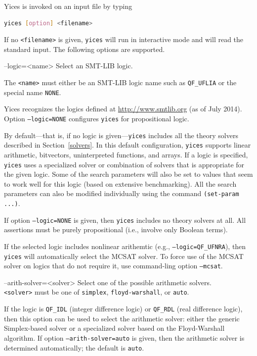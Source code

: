 \documentclass[11pt,twoside,fleqn,openright,titlepage]{cslreport}
\newenvironment{options}{
\begin{list}{}{
\setlength{\labelsep}{1.8ex}
\setlength{\labelwidth}{0pt}
\setlength{\itemindent}{-0.5\leftmargin}
\settowidth{\leftmargin}{\texttt{--}}
\renewcommand{\makelabel}{\optionlabel}}}
{\end{list}}
\newcommand*\optionlabel[1]{\hspace\labelsep\texttt{#1}}
\begin{document}
Yices is invoked on an input file by typing
\begin{lstlisting}[language=sh]
   yices [option] <filename>
\end{lstlisting}
If no \texttt{<filename>} is given, \texttt{yices} will run in
interactive mode and will read the standard input. The following
options are supported.
\begin{options}
\item[--logic=<name>] Select an SMT-LIB logic.

  The \texttt{<name>} must either be an SMT-LIB logic name such as
  \texttt{QF\_UFLIA} or the special name \texttt{NONE}.

  Yices recognizes the logics defined at \url{http://www.smtlib.org}
  (as of July 2014).  Option \texttt{--logic=NONE} configures
  \texttt{yices} for propositional logic.

  By default---that is, if no logic is given---\texttt{yices} includes
  all the  theory solvers described in  Section~\ref{solvers}. In this
  default  configuration, \texttt{yices}  supports  linear arithmetic,
  bitvectors,  uninterpreted  functions, and  arrays.  If  a logic  is
  specified, \texttt{yices}  uses a specialized  solver or combination
  of  solvers that is  appropriate for  the given  logic. Some  of the
  search parameters will also be set  to values that seem to work well
  for  this logic (based  on extensive  benchmarking). All  the search
  parameters  can  also be  modified  individually  using the  command
  \texttt{(set-param ...)}.

  If  option  \texttt{--logic=NONE}   is  given,  then  \texttt{yices}
  includes no  theory solvers  at all. All  assertions must  be purely
  propositional (i.e., involve only Boolean terms).

  If the selected logic includes nonlinear arithemtic (e.g.,
  \texttt{--logic=QF\_UFNRA}), then \texttt{yices} will automatically
  select the MCSAT solver. To force use of the MCSAT solver on logics
  that do not require it, use command-ling option \texttt{--mcsat}.

\item[--arith-solver=<solver>] Select one of the possible arithmetic solvers.\\[1mm]
  \texttt{<solver>}     must    be     one     of    \texttt{simplex},
  \texttt{floyd-warshall}, or \texttt{auto}.

  If  the  logic is  \texttt{QF\_IDL}  (integer  difference logic)  or
  \texttt{QF\_RDL} (real  difference logic),  then this option  can be
  used   to  select   the  arithmetic   solver:  either   the  generic
  Simplex-based  solver   or  a   specialized  solver  based   on  the
  Floyd-Warshall algorithm.  If option \texttt{--arith-solver=auto} is
  given, then  the arithmetic solver is  determined automatically; the
  default is \texttt{auto}.


\end{options}
\end{document}

